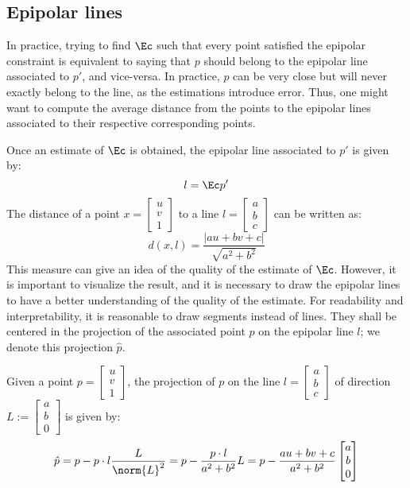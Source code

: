 \subsection{Epipolar lines}
In practice, trying to find $\Ec$ such that every point satisfied the epipolar constraint is equivalent to saying that $p$ should belong to the epipolar line associated to $p'$, and vice-versa. In practice, $p$ can be very close but will never exactly belong to the line, as the estimations introduce error. Thus, one might want to compute the average distance from the points to the epipolar lines associated to their respective corresponding points.

Once an estimate of $\Ec$ is obtained, the epipolar line associated to $p'$ is given by:
\begin{equation*}
    l = \Ec p'
\end{equation*}
The distance of a point $x=\begin{bmatrix}
    u\\v\\1
\end{bmatrix}$ to a line $l=\begin{bmatrix}
    a\\b\\c
\end{bmatrix}$ can be written as:
\begin{equation*}
    d(x,l) = \frac{|au+bv+c|}{\sqrt{a^2+b^2}}
\end{equation*}
This measure can give an idea of the quality of the estimate of $\Ec$. However, it is important to visualize the result, and it is necessary to draw the epipolar lines to have a better understanding of the quality of the estimate. For readability and interpretability, it is reasonable to draw segments instead of lines. They shall be centered in the projection of the associated point $p$ on the epipolar line $l$; we denote this projection $\hat{p}$.

Given a point $p=\begin{bmatrix}u\\v\\1\end{bmatrix}$, the projection of $p$ on the line $l=\begin{bmatrix}a\\b\\c\end{bmatrix}$ of direction $L:=\begin{bmatrix}a\\b\\0\end{bmatrix}$ is given by:
\begin{equation*}
    \hat{p} = p - p\cdot l\frac{L}{\norm{L}^2} = p-\frac{p\cdot l}{a^2+b^2}L = p-\frac{au+bv+c}{a^2+b^2}\begin{bmatrix}a\\b\\0\end{bmatrix}
\end{equation*}

